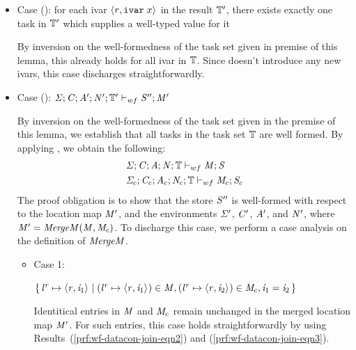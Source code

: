 \begin{bproof}
\begin{bcase}[\dregpardataconjoin{}]
\begin{enumerate}
\begin{itemize}
\item Case ():
      for each ivar $\langle \mathit{r}, \texttt{ivar}\; x \rangle ^{}$ in the result $\mathbb{T}'$,
      there exists exactly one task in $\mathbb{T}'$ which supplies a well-typed value for it

By inversion on the well-formedness of the task set given in premise of this lemma,
this already holds for all ivar in $\mathbb{T}$.
%
Since \dregparletlocafternewreg{} doesn't introduce any new ivars,
this case discharges straightforwardly.

\item Case ():
      $\mathit{\Sigma};\mathit{C};\mathit{A}';\mathit{N}';\mathbb{T}' \vdash_{wf} \mathit{S}'';\mathit{M}'$


By inversion on the well-formedness of the task set given in the premise of this lemma,
we establish that all tasks in the task set $\mathbb{T}$ are well formed.
%
By applying ,
we obtain the following:
%
\begin{align}
& \label{prf:wf-datacon-join-eqn2} \storewf{\SENV}{\CENV}{\AENV}{\NENV}{\TASKSET}{\MENV}{\STOR} \\
%
& \label{prf:wf-datacon-join-eqn3} \storewf{\SENV_c}{\CENV_c}{\AENV_c}{\NENV_c}{\TASKSET}{\MENV_c}{\STOR_c}
\end{align}
%
The proof obligation is to show that the store $\mathit{S}''$
is well-formed with respect to the location map $\mathit{M}'$,
and the environments $\mathit{\Sigma}'$, $\mathit{C}'$, $\mathit{A}'$, and $\mathit{N}'$,
%
where $\mathit{M}' = \mathit{MergeM}(\mathit{M}, \mathit{M}_c)$.
%
To discharge this case,
we perform a case analysis on the definition of $\mathit{MergeM}$.

\begin{itemize}

\item Case 1:

   $
  {\{ \, {\mathit{l}}^{\mathit{r}} \mapsto \langle \mathit{r}, \mathit{i}_1 \rangle ^{} \mid
  ({\mathit{l}}^{\mathit{r}} \mapsto \langle \mathit{r}, \mathit{i}_1 \rangle ^{}) \in \mathit{M},
  ({\mathit{l}}^{\mathit{r}} \mapsto \langle \mathit{r}, \mathit{i}_2 \rangle ^{}) \in \mathit{M}_c,
  \mathit{i}_1 = \mathit{i}_2 \,\}}
  $

   Identitical entries in $\mathit{M}$ and $\mathit{M}_c$ remain unchanged in the merged location map $\mathit{M}'$.
   For such entries, this case holds straightforwardly by using Results~(\ref{prf:wf-datacon-join-eqn2}) and (\ref{prf:wf-datacon-join-eqn3}).


\end{itemize}
\end{itemize}
\end{enumerate}
\end{bcase}
\end{bproof}
